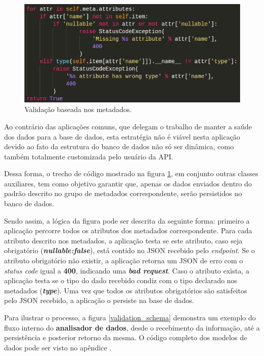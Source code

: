 \documentclass[12pt, openright, oneside, a4paper, brazil]{abntex2}
\begin{document}
\begin{figure}[h!tp]
	\caption{\label{validation}Validação baseada nos metadados.}
	\begin{center}
		\includegraphics[scale=0.83]{images/python_validation.png}
	\end{center}
	\hspace{5.5cm}{Fonte: O Autor.}
\end{figure}

Ao contrário das aplicações comuns, que delegam o trabalho de manter a saúde dos dados para a base de dados, esta estratégia não é viável nesta aplicação devido ao fato da estrutura do banco de dados não só ser dinâmica, como também totalmente customizada pelo usuário da API.

Dessa forma, o trecho de código mostrado na figura \ref{validation}, em conjunto outras classes auxiliares, tem como objetivo garantir que, apenas os dados enviados dentro do padrão descrito no grupo de metadados correspondente, serão persistidos no banco de dados.

Sendo assim, a lógica da figura pode ser descrita da seguinte forma: primeiro a aplicação percorre todos os atributos dos metadados correspondente. Para cada atributo descrito nos metadados, a aplicação testa se este atributo, caso seja obrigatório (\textbf{\textit{nullable:false}}), está contido no JSON recebido pelo \textit{endpoint}. Se o atributo obrigatório não existir, a aplicação retorna um JSON de erro com o \textit{status code} igual a \textbf{400}, indicando uma \textbf{\textit{bad request}}. Caso o atributo exista, a aplicação testa se o tipo do dado recebido condiz com o tipo declarado nos metadados (\textbf{\textit{type}}). Uma vez que todos os atributos obrigatórios são satisfeitos pelo JSON recebido, a aplicação o persiste na base de dados.

Para ilustrar o processo, a figura \ref{validation_schema} demonstra um exemplo do fluxo interno do \textbf{analisador de dados}, desde o recebimento da informação, até a persistência e posterior retorno da mesma. O código completo dos modelos de dados pode ser visto no apêndice .
\end{document}
